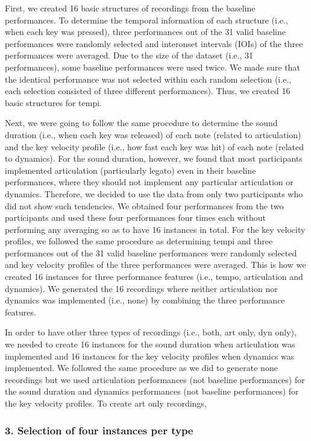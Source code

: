 \documentclass[
  man,floatsintext]{apa6}
\begin{document}
First, we created 16 basic structures of recordings from the baseline performances. To determine the temporal information of each structure (i.e., when each key was pressed), three performances out of the 31 valid baseline performances were randomly selected and interonset intervals (IOIs) of the three performances were averaged. Due to the size of the dataset (i.e., 31 performances), some baseline performances were used twice. We made sure that the identical performance was not selected within each random selection (i.e., each selection consisted of three different performances). Thus, we created 16 basic structures for tempi.

Next, we were going to follow the same procedure to determine the sound duration (i.e., when each key was released) of each note (related to articulation) and the key velocity profile (i.e., how fast each key was hit) of each note (related to dynamics). For the sound duration, however, we found that most participants implemented articulation (particularly legato) even in their baseline performances, where they should not implement any particular articulation or dynamics. Therefore, we decided to use the data from only two participants who did not show such tendencies. We obtained four performances from the two participants and used these four performances four times each without performing any averaging so as to have 16 instances in total. For the key velocity profiles, we followed the same procedure as determining tempi and three performances out of the 31 valid baseline performances were randomly selected and key velocity profiles of the three performances were averaged. This is how we created 16 instances for three performance features (i.e., tempo, articulation and dynamics). We generated the 16 recordings where neither articulation nor dynamics was implemented (i.e., none) by combining the three performance features.

In order to have other three types of recordings (i.e., both, art only, dyn only), we needed to create 16 instances for the sound duration when articulation was implemented and 16 instances for the key velocity profiles when dynamics was implemented. We followed the same procedure as we did to generate none recordings but we used articulation performances (not baseline performances) for the sound duration and dynamics performances (not baseline performances) for the key velocity profiles. To create art only recordings,

\hypertarget{selection-of-four-instances-per-type}{%
\subsubsection{3. Selection of four instances per type}\label{selection-of-four-instances-per-type}}
\end{document}

